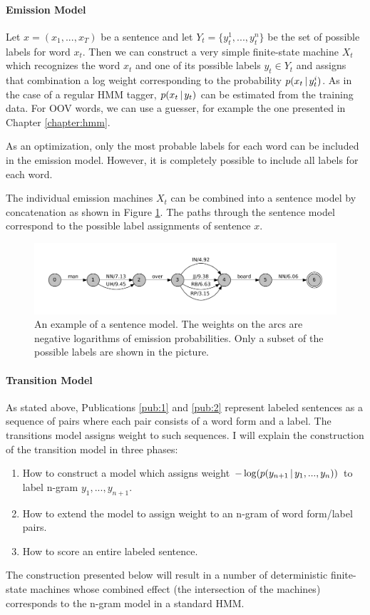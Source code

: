 \paragraph{Emission Model} Let $x = (x_1, ..., x_T)$ be a sentence and
let $Y_t = \{y_t^1, ..., y_t^n\}$ be the set of possible labels for
word $x_t$. Then we can construct a very simple finite-state machine
$X_t$ which recognizes the word $x_t$ and one of its possible labels
$y_t \in Y_t$ and assigns that combination a log weight corresponding
to the probability $p(x_t\mbox{$ \, | \, $} y_t^i)$. As in the case of a regular HMM tagger,
$p(x_t\mbox{$ \, | \, $} y_t)$ can be estimated from the training data. For OOV words,
we can use a guesser, for example the one presented in Chapter
\ref{chapter:hmm}.

As an optimization, only the most probable labels for each word can be
included in the emission model. However, it is completely possible to
include all labels for each word.

The individual emission machines $X_t$ can be combined into a sentence
model by concatenation as shown in Figure
\ref{fig:sentence-model}. The paths through the sentence model
correspond to the possible label assignments of sentence $x$.

\begin{figure}[!htb]
\includegraphics[scale=0.5]{sentence_model}
\caption{An example of a sentence model. The weights on the arcs are
  negative logarithms of emission probabilities. Only a subset of the
  possible labels are shown in the picture.}\label{fig:sentence-model}
\end{figure}

\paragraph{Transition Model} As stated above, Publications \ref{pub:1}
and \ref{pub:2} represent labeled sentences as a sequence of pairs
where each pair consists of a word form and a label. The transitions
model assigns weight to such sequences. I will explain the
construction of the transition model in three phases:
\begin{enumerate}
\item How to construct a model which assigns weight $-\log(p(y_{n+1}\mbox{$ \, | \, $}
y_{1}, ..., y_{n}))$ to label n-gram $y_1, ..., y_{n+1}$.
\item How to extend the model to assign weight to an n-gram of word form/label pairs.
\item How to score an entire labeled sentence.
\end{enumerate}
The construction presented below will result in a number of
deterministic finite-state machines whose combined effect (the
intersection of the machines) corresponds to the n-gram model in a
standard HMM.

